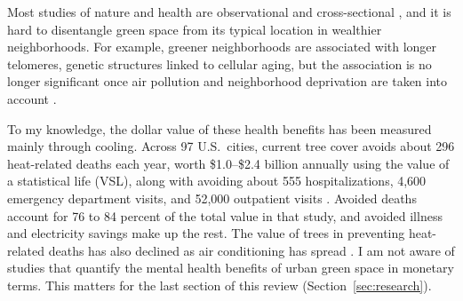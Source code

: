 \documentclass[12pt]{article}
\begin{document}
Most studies of nature and health are observational and cross-sectional \citep{donovanRelationshipTreesHuman2013}, and it is hard to disentangle green space from its typical location in wealthier neighborhoods. For example, greener neighborhoods are associated with longer telomeres, genetic structures linked to cellular aging, but the association is no longer significant once air pollution and neighborhood deprivation are taken into account \citep{ogletreeRelationshipGreenspaceExposure2023}.

To my knowledge, the dollar value of these health benefits has been measured mainly through cooling. Across 97 U.S.\ cities, current tree cover avoids about 296 heat-related deaths each year, worth \$1.0--\$2.4 billion annually using the value of a statistical life (VSL), along with avoiding about 555 hospitalizations, 4,600 emergency department visits, and 52,000 outpatient visits \citep{mcdonaldValueUSUrban2020}. Avoided deaths account for 76 to 84 percent of the total value in that study, and avoided illness and electricity savings make up the rest. The value of trees in preventing heat-related deaths has also declined as air conditioning has spread \citep{mcdonaldValueUSUrban2020}. I am not aware of studies that quantify the mental health benefits of urban green space in monetary terms. This matters for the last section of this review (Section~\ref{sec:research}). 
\end{document}
